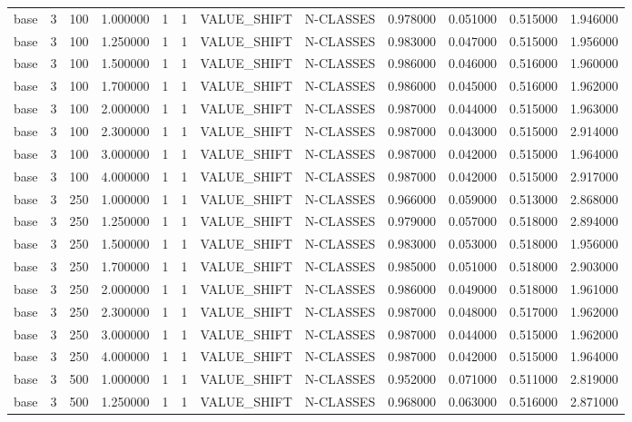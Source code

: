 \begin{tabular}{lrrrllllrrrr}
base & 3 & 100 & 1.000000 & 1 & 1 & VALUE_SHIFT & N-CLASSES & 0.978000 & 0.051000 & 0.515000 & 1.946000 \\
base & 3 & 100 & 1.250000 & 1 & 1 & VALUE_SHIFT & N-CLASSES & 0.983000 & 0.047000 & 0.515000 & 1.956000 \\
base & 3 & 100 & 1.500000 & 1 & 1 & VALUE_SHIFT & N-CLASSES & 0.986000 & 0.046000 & 0.516000 & 1.960000 \\
base & 3 & 100 & 1.700000 & 1 & 1 & VALUE_SHIFT & N-CLASSES & 0.986000 & 0.045000 & 0.516000 & 1.962000 \\
base & 3 & 100 & 2.000000 & 1 & 1 & VALUE_SHIFT & N-CLASSES & 0.987000 & 0.044000 & 0.515000 & 1.963000 \\
base & 3 & 100 & 2.300000 & 1 & 1 & VALUE_SHIFT & N-CLASSES & 0.987000 & 0.043000 & 0.515000 & 2.914000 \\
base & 3 & 100 & 3.000000 & 1 & 1 & VALUE_SHIFT & N-CLASSES & 0.987000 & 0.042000 & 0.515000 & 1.964000 \\
base & 3 & 100 & 4.000000 & 1 & 1 & VALUE_SHIFT & N-CLASSES & 0.987000 & 0.042000 & 0.515000 & 2.917000 \\
base & 3 & 250 & 1.000000 & 1 & 1 & VALUE_SHIFT & N-CLASSES & 0.966000 & 0.059000 & 0.513000 & 2.868000 \\
base & 3 & 250 & 1.250000 & 1 & 1 & VALUE_SHIFT & N-CLASSES & 0.979000 & 0.057000 & 0.518000 & 2.894000 \\
base & 3 & 250 & 1.500000 & 1 & 1 & VALUE_SHIFT & N-CLASSES & 0.983000 & 0.053000 & 0.518000 & 1.956000 \\
base & 3 & 250 & 1.700000 & 1 & 1 & VALUE_SHIFT & N-CLASSES & 0.985000 & 0.051000 & 0.518000 & 2.903000 \\
base & 3 & 250 & 2.000000 & 1 & 1 & VALUE_SHIFT & N-CLASSES & 0.986000 & 0.049000 & 0.518000 & 1.961000 \\
base & 3 & 250 & 2.300000 & 1 & 1 & VALUE_SHIFT & N-CLASSES & 0.987000 & 0.048000 & 0.517000 & 1.962000 \\
base & 3 & 250 & 3.000000 & 1 & 1 & VALUE_SHIFT & N-CLASSES & 0.987000 & 0.044000 & 0.515000 & 1.962000 \\
base & 3 & 250 & 4.000000 & 1 & 1 & VALUE_SHIFT & N-CLASSES & 0.987000 & 0.042000 & 0.515000 & 1.964000 \\
base & 3 & 500 & 1.000000 & 1 & 1 & VALUE_SHIFT & N-CLASSES & 0.952000 & 0.071000 & 0.511000 & 2.819000 \\
base & 3 & 500 & 1.250000 & 1 & 1 & VALUE_SHIFT & N-CLASSES & 0.968000 & 0.063000 & 0.516000 & 2.871000 \\

\end{tabular}
